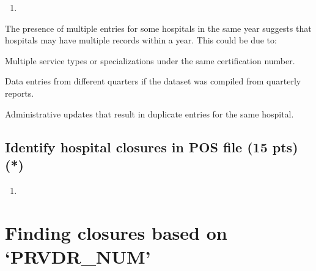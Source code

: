 \documentclass[
  letterpaper,
  DIV=11,
  numbers=noendperiod]{scrartcl}
\providecommand{\tightlist}{%
  \setlength{\itemsep}{0pt}\setlength{\parskip}{0pt}}\usepackage{longtable,booktabs,array}
\begin{document}
\begin{enumerate}
\def\labelenumi{\alph{enumi}.}
\setcounter{enumi}{1}
\tightlist
\item
\end{enumerate}

The presence of multiple entries for some hospitals in the same year
suggests that hospitals may have multiple records within a year. This
could be due to:

Multiple service types or specializations under the same certification
number.

Data entries from different quarters if the dataset was compiled from
quarterly reports.

Administrative updates that result in duplicate entries for the same
hospital.

\subsection{Identify hospital closures in POS file (15 pts)
(*)}\label{identify-hospital-closures-in-pos-file-15-pts}

\begin{enumerate}
\def\labelenumi{\arabic{enumi}.}
\tightlist
\item
\end{enumerate}

\section{Finding closures based on
`PRVDR\_NUM'}\label{finding-closures-based-on-prvdr_num}
\end{document}
